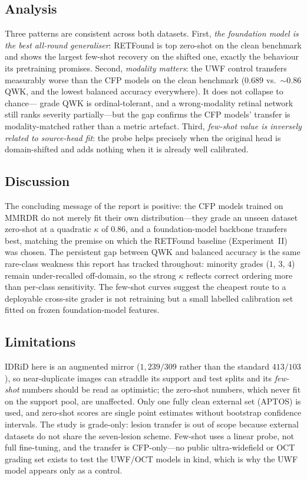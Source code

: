 \documentclass[journal,twoside,web]{ieeecolor}
\begin{document}
\subsection{Analysis}
Three patterns are consistent across both datasets. First, \emph{the foundation model
is the best all-round generaliser}: RETFound is top zero-shot on the clean benchmark
and shows the largest few-shot recovery on the shifted one, exactly the behaviour its
pretraining promises. Second, \emph{modality matters}: the UWF control transfers
measurably worse than the CFP models on the clean benchmark ($0.689$ vs.\ $\sim0.86$
QWK, and the lowest balanced accuracy everywhere). It does not collapse to chance---%
grade QWK is ordinal-tolerant, and a wrong-modality retinal network still ranks
severity partially---but the gap confirms the CFP models' transfer is modality-matched
rather than a metric artefact. Third, \emph{few-shot value is inversely related to
source-head fit}: the probe helps precisely when the original head is domain-shifted
and adds nothing when it is already well calibrated.

\subsection{Discussion}
The concluding message of the report is positive: the CFP models trained on MMRDR do
not merely fit their own distribution---they grade an unseen dataset zero-shot at a
quadratic $\kappa$ of $0.86$, and a foundation-model backbone transfers best, matching
the premise on which the RETFound baseline (Experiment~II) was chosen. The persistent
gap between QWK and balanced accuracy is the same rare-class weakness this report has
tracked throughout: minority grades ($1$, $3$, $4$) remain under-recalled off-domain,
so the strong $\kappa$ reflects correct ordering more than per-class sensitivity. The
few-shot curves suggest the cheapest route to a deployable cross-site grader is not
retraining but a small labelled calibration set fitted on frozen foundation-model
features.

\subsection{Limitations}
IDRiD here is an augmented mirror ($1{,}239/309$ rather than the standard $413/103$),
so near-duplicate images can straddle its support and test splits and its
\emph{few-shot} numbers should be read as optimistic; the zero-shot numbers, which
never fit on the support pool, are unaffected. Only one fully clean external set
(APTOS) is used, and zero-shot scores are single point estimates without bootstrap
confidence intervals. The study is grade-only: lesion transfer is out of scope because
external datasets do not share the seven-lesion scheme. Few-shot uses a linear probe,
not full fine-tuning, and the transfer is CFP-only---no public ultra-widefield or OCT
grading set exists to test the UWF/OCT models in kind, which is why the UWF model
appears only as a control.
\end{document}
